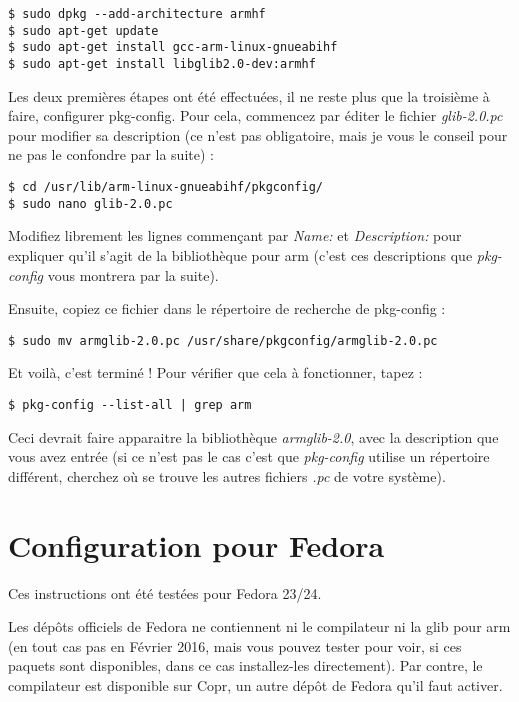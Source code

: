 \documentclass[a4paper,11pt]{article}
\begin{document}
\begin{lstlisting}[]
$ sudo dpkg --add-architecture armhf
$ sudo apt-get update
$ sudo apt-get install gcc-arm-linux-gnueabihf
$ sudo apt-get install libglib2.0-dev:armhf
\end{lstlisting}
\par Les deux premières étapes ont été effectuées, il ne reste plus que la troisième à faire, configurer pkg-config. Pour cela, commencez par éditer le fichier \emph{glib-2.0.pc} pour modifier sa description (ce n'est pas obligatoire, mais je vous le conseil pour ne pas le confondre par la suite) :

\begin{lstlisting}
$ cd /usr/lib/arm-linux-gnueabihf/pkgconfig/
$ sudo nano glib-2.0.pc
\end{lstlisting}

\par Modifiez librement les lignes commençant par \emph{Name:} et \emph{Description:} pour expliquer qu'il s'agit de la bibliothèque pour arm (c'est ces descriptions que \emph{pkg-config} vous montrera par la suite).
\par Ensuite, copiez ce fichier dans le répertoire de recherche de pkg-config :

\begin{lstlisting}[]
$ sudo mv armglib-2.0.pc /usr/share/pkgconfig/armglib-2.0.pc
\end{lstlisting}

\par Et voilà, c'est terminé ! Pour vérifier que cela à fonctionner, tapez :

\begin{lstlisting}[]
$ pkg-config --list-all | grep arm
\end{lstlisting}

\par Ceci devrait faire apparaitre la bibliothèque \emph{armglib-2.0}, avec la description que vous avez entrée (si ce n'est pas le cas c'est que \emph{pkg-config} utilise un répertoire différent, cherchez où se trouve les autres fichiers \emph{.pc} de votre système).

\section{Configuration pour Fedora}

\indent \par Ces instructions ont été testées pour Fedora 23/24.
\par Les dépôts officiels de Fedora ne contiennent ni le compilateur ni la glib pour arm (en tout cas pas en Février 2016, mais vous pouvez tester pour voir, si ces paquets sont disponibles, dans ce cas installez-les directement). Par contre, le compilateur est disponible sur Copr, un autre dépôt de Fedora qu'il faut activer.
\end{document}
